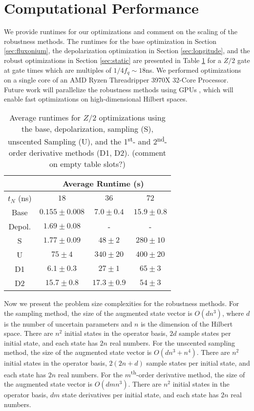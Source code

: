 \section{Computational Performance \label{appendix:time}}
We provide runtimes for our optimizations and comment on the scaling of the
robustness methods. The runtimes for
the base optimization in Section \ref{sec:fluxonium},
the depolarization optimization in Section \ref{sec:longitude},
and the robust optimizations in Section \ref{sec:static}
are presented in Table \ref{tab:time}
for a $Z/2$ gate at gate times which are multiples of $1/4f_{q} \sim 18$ns.
We performed optimizations on a single core of
an AMD Ryzen Threadripper 3970X 32-Core Processor.
Future work will parallelize the robustness methods using GPUs
\cite{leung2017speedup},
which will enable fast optimizations on high-dimensional Hilbert spaces.

\begin{table}[H]
  \centering
  \begin{tabular} {c | c | c | c }
    & \multicolumn{3}{c}{Average Runtime (s)}\\
    \hline
    $t_{N}$ (ns) & $18$ & $36$ & $72$\\
    \hline
    Base & $0.155 \pm 0.008$ & $7.0 \pm 0.4$ & $15.9 \pm 0.8$\\
    Depol. & $1.69 \pm 0.08$ & - & -\\
    S & $1.77 \pm 0.09$ & $48 \pm 2$ & $280 \pm 10$\\
    U & $75 \pm 4$ & $340 \pm 20$ & $400 \pm 20$\\
    D1 & $6.1 \pm 0.3$ & $27 \pm 1$ & $65 \pm 3$\\
    D2 & $15.7 \pm 0.8$ & $17.3 \pm 0.9$ & $54 \pm 3$\\
  \end{tabular}
  \caption{
    Average runtimes for $Z/2$ optimizations
    using the base, depolarization, sampling (S),
    unscented Sampling (U), and the 1\textsuperscript{st}-
    and 2\textsuperscript{nd}-order derivative methods (D1, D2). (comment on empty table slots?)
  }
  \label{tab:time}
\end{table}

Now we present the problem size complexities for the robustness methods.
For the sampling method, the size of the augmented state vector
is $O(dn^{3})$, where $d$ is the number of uncertain parameters and
$n$ is the dimension of the Hilbert space. There are $n^{2}$ initial states
in the operator basis, $2d$ sample states per initial state,
and each state has $2n$ real numbers.
For the unscented sampling method, the size of the augmented state vector
is $O(dn^{3} + n^{4})$.
There are $n^{2}$ initial states in the operator basis,
$2(2n + d)$ sample states per initial state,
and each state has $2n$ real numbers.
For the $m$\textsuperscript{th}-order derivative method, the size of the augmented state vector
is $O(dmn^{3})$. There are $n^{2}$
initial states in the operator basis, $dm$ state derivatives per initial state,
and each state has $2n$ real numbers.
